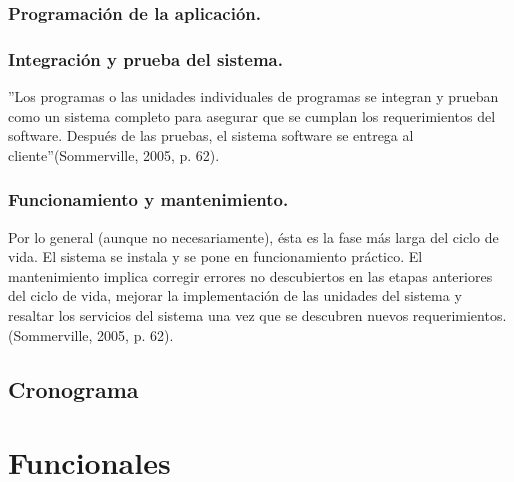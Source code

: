 \documentclass[11pt,a4paper]{article}
\begin{document}
\subsubsection{Programación de la aplicación.}

\subsubsection{Integración y prueba del sistema.}
''Los programas o las unidades individuales de programas se integran y prueban como un sistema completo para asegurar que se cumplan los requerimientos del software. Después de las pruebas, el sistema software se entrega al cliente''(Sommerville, 2005, p. 62).

\subsubsection{Funcionamiento y mantenimiento.}
Por lo general (aunque no necesariamente), ésta es la fase más larga del ciclo de vida. El sistema se instala y se pone en funcionamiento práctico. El mantenimiento implica corregir errores no descubiertos en las etapas anteriores del ciclo de vida, mejorar la implementación de las unidades del sistema y resaltar los servicios del sistema una vez que se descubren nuevos requerimientos.(Sommerville, 2005, p. 62).

\subsection{Cronograma}


\section{Funcionales}
\end{document}
